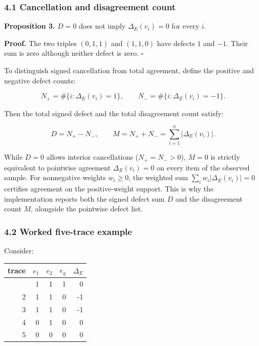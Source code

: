 \documentclass[
  11pt,
]{article}
\theoremstyle{plain}
\theoremstyle{definition}\newtheorem{definition}[theorem]{Definition}
\theoremstyle{remark}\newtheorem*{remark}{Remark}
\begin{document}
\subsubsection{4.1 Cancellation and disagreement count}\label{cancellation-and-disagreement-count}

\textbf{Proposition 3.} \(D=0\) does not imply
\(\Delta_E(v_i)=0\) for every \(i\).

\textbf{Proof.} The two triples \((0,1,1)\) and \((1,1,0)\) have defects \(1\) and \(-1\).
Their sum is zero although neither defect is zero. \(\square\)

To distinguish signed cancellation from total agreement, define the positive and negative defect counts:

\[
N_+ = \#\{i : \Delta_E(v_i) = 1\}, \qquad N_- = \#\{i : \Delta_E(v_i) = -1\}.
\]

Then the total signed defect and the total disagreement count satisfy:

\[
D = N_+ - N_-, \qquad M = N_+ + N_- = \sum_{i=1}^n |\Delta_E(v_i)|.
\]

While \(D=0\) allows interior cancellations (\(N_+ = N_- > 0\)), \(M=0\) is strictly equivalent to pointwise agreement \(\Delta_E(v_i)=0\) on every item of the observed sample. For nonnegative weights \(w_i \ge 0\), the weighted sum \(\sum_i w_i |\Delta_E(v_i)| = 0\) certifies agreement on the positive-weight support. This is why the implementation reports both the signed defect sum \(D\) and the disagreement count \(M\), alongside the pointwise defect list.

\subsubsection{4.2 Worked five-trace example}\label{worked-five-trace-example}

Consider:

\begin{longtable}[]{@{}rrrrr@{}}
\toprule\noalign{}
trace & \(e_1\) & \(e_2\) & \(e_g\) & \(\Delta_E\) \\
\midrule\noalign{}
\endhead
\bottomrule\noalign{}
\endlastfoot
1 & 1 & 1 & 1 & 0 \\
2 & 1 & 1 & 0 & -1 \\
3 & 1 & 1 & 0 & -1 \\
4 & 0 & 1 & 0 & 0 \\
5 & 0 & 0 & 0 & 0 \\
\end{longtable}
\end{document}
